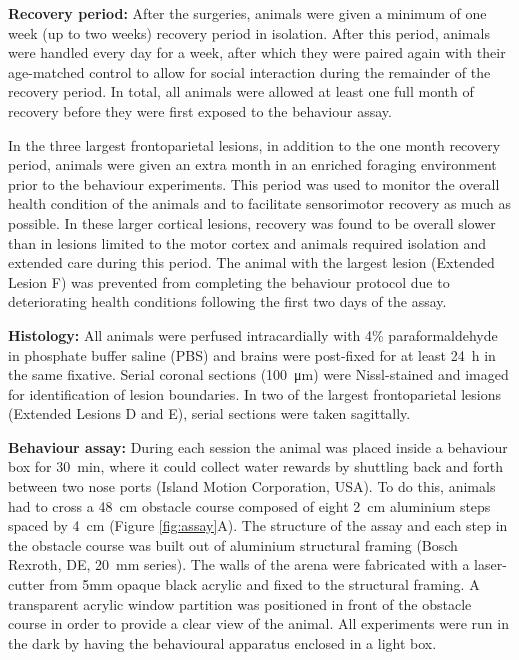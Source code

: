 \textbf{Recovery period:} After the surgeries, animals were given a minimum of one week (up to two weeks) recovery period in isolation. After this period, animals were handled every day for a week, after which they were paired again with their age-matched control to allow for social interaction during the remainder of the recovery period. In total, all animals were allowed at least one full month of recovery before they were first exposed to the behaviour assay.

In the three largest frontoparietal lesions, in addition to the one month recovery period, animals were given an extra month in an enriched foraging environment prior to the behaviour experiments. This period was used to monitor the overall health condition of the animals and to facilitate sensorimotor recovery as much as possible. In these larger cortical lesions, recovery was found to be overall slower than in lesions limited to the motor cortex and animals required isolation and extended care during this period. The animal with the largest lesion (Extended Lesion F) was prevented from completing the behaviour protocol due to deteriorating health conditions following the first two days of the assay.

\textbf{Histology:} All animals were perfused intracardially with 4\% paraformaldehyde in phosphate buffer saline (PBS) and brains were post-fixed for at least \SI{24}{\hour} in the same fixative. Serial coronal sections (\SI{100}{\micro\meter}) were Nissl-stained and imaged for identification of lesion boundaries. In two of the largest frontoparietal lesions (Extended Lesions D and E), serial sections were taken sagittally.

\textbf{Behaviour assay:} During each session the animal was placed inside a behaviour box for \SI{30}{\minute}, where it could collect water rewards by shuttling back and forth between two nose ports (Island Motion Corporation, USA). To do this, animals had to cross a \SI{48}{\centi\meter} obstacle course composed of eight \SI{2}{\centi\meter} aluminium steps spaced by \SI{4}{\centi\meter} (Figure \ref{fig:assay}A). The structure of the assay and each step in the obstacle course was built out of aluminium structural framing (Bosch Rexroth, DE, \SI{20}{\milli\meter} series). The walls of the arena were fabricated with a laser-cutter from 5mm opaque black acrylic and fixed to the structural framing. A transparent acrylic window partition was positioned in front of the obstacle course in order to provide a clear view of the animal. All experiments were run in the dark by having the behavioural apparatus enclosed in a light box.

